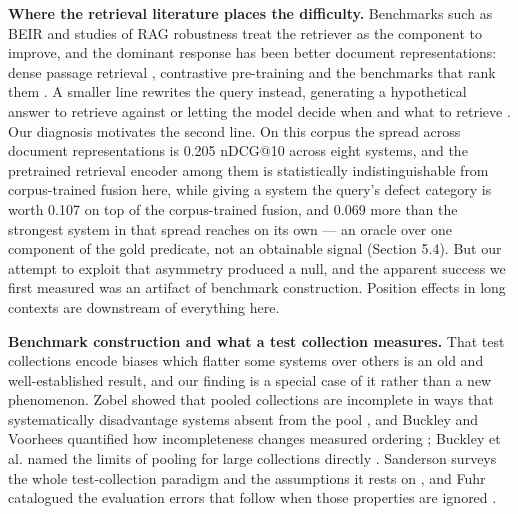 \documentclass[acmsmall]{acmart}
\begin{document}
\textbf{Where the retrieval literature places the difficulty.} Benchmarks such as BEIR \cite{thakur2021beir} and studies of RAG robustness \cite{chen2023benchmarkingrag} treat the retriever as the component to improve, and the dominant response has been better document representations: dense passage retrieval \cite{karpukhin2020dpr}, contrastive pre-training \cite{izacard2021contriever,wang2022e5} and the benchmarks that rank them \cite{muennighoff2022mteb}. A smaller line rewrites the query instead, generating a hypothetical answer to retrieve against \cite{gao2022hyde} or letting the model decide when and what to retrieve \cite{asai2023selfrag}. Our diagnosis motivates the second line. On this corpus the spread across document representations is 0.205 nDCG@10 across eight systems, and the pretrained retrieval encoder among them is statistically indistinguishable from corpus-trained fusion here, while giving a system the query's defect category is worth 0.107 on top of the corpus-trained fusion, and 0.069 more than the strongest system in that spread reaches on its own --- an oracle over one component of the gold predicate, not an obtainable signal (Section 5.4). But our attempt to exploit that asymmetry produced a null, and the apparent success we first measured was an artifact of benchmark construction. Position effects in long contexts \cite{liu2023lostinmiddle} are downstream of everything here.

\textbf{Benchmark construction and what a test collection measures.} That test collections encode biases which flatter some systems over others is an old and well-established result, and our finding is a special case of it rather than a new phenomenon. Zobel showed that pooled collections are incomplete in ways that systematically disadvantage systems absent from the pool \cite{zobel1998reliable}, and Buckley and Voorhees quantified how incompleteness changes measured ordering \cite{buckley2004incomplete}; Buckley et al. named the limits of pooling for large collections directly \cite{buckley2007bias}. Sanderson surveys the whole test-collection paradigm and the assumptions it rests on \cite{sanderson2010testcollections}, and Fuhr catalogued the evaluation errors that follow when those properties are ignored \cite{fuhr2017mistakes}.
\end{document}
